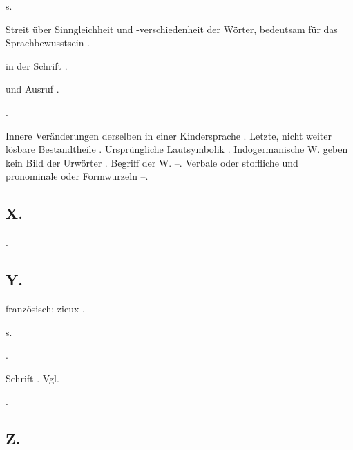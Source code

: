 \begin{register}

 s. 

 Streit über Sinngleichheit und -verschiedenheit der Wörter, bedeutsam für das Sprachbewusstsein \pageref{sp.97}.

 in der Schrift \pageref{sp.131}.


 und Ausruf \pageref{sp.322}.

 \pageref{sp.103}.

 Innere Veränderungen derselben in einer Kindersprache \pageref{sp.65}. Letzte, nicht weiter lösbare Bestandtheile \pageref{sp.179}. Ursprüngliche Lautsymbolik \pageref{sp.225}.  Indogermanische W. geben kein Bild der Urwörter \pageref{sp.255}. Begriff der W. \pageref{sp.295}–\pageref{sp.297}. Verbale oder stoffliche und pronominale oder Formwurzeln \pageref{sp.395}–\pageref{sp.396}.



\subsection*{X.}\label{reg.X}

 \pageref{sp.20}.

\subsection*{Y.}\label{reg.Y}

 \pageref{sp.358}

 französisch: zieux \pageref{sp.203}.

 s. 

 \pageref{sp.282}.

 Schrift \pageref{sp.130}. Vgl. 

 \pageref{sp.153}.

\subsection*{Z.}\label{reg.Z}


\end{register}
